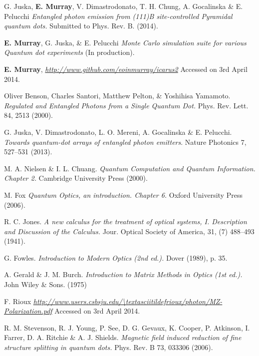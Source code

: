 \documentclass[12pt, twoside]{article}
\numberwithin{equation}{section}
\begin{document}
\begin{thebibliography}{99}

  G. Juska, \textbf{E. Murray}, V. Dimastrodonato, T. H. Chung, A. Gocalinska \& E. Pelucchi
  \emph{Entangled photon emission from (111)B site-controlled Pyramidal quantum dots.}
  Submitted to Phys. Rev. B.
  (2014).

  \textbf{E. Murray}, G. Juska, \& E. Pelucchi
  \emph{Monte Carlo simulation suite for various Quantum dot experiments}
  (In production).

  \textbf{E. Murray},
  \emph{ \url{http://www.github.com/eoinmurray/icarus2} }
  Accessed on 3rd April 2014.

  Oliver Benson, Charles Santori, Matthew Pelton, \& Yoshihisa Yamamoto.
  \emph{Regulated and Entangled Photons from a Single Quantum Dot.}
  Phys. Rev. Lett.
  84,
  2513 (2000).

  G. Juska, V. Dimastrodonato, L. O. Mereni, A. Gocalinska \& E. Pelucchi.
  \emph{Towards quantum-dot arrays of entangled photon emitters}.
  Nature Photonics 
  7, 
  527–531 (2013).

   M. A. Nielsen \& I. L. Chuang.
   \emph{Quantum Computation and Quantum Information. Chapter 2.}
   Cambridge University Press (2000). 

    M. Fox
   \emph{Quantum Optics, an introduction. Chapter 6.}
   Oxford University Press (2006). 

  R. C. Jones.
  \emph{A new calculus for the treatment of optical systems, I. Description and Discussion of the Calculus.}
  Jour. Optical Society of America,
  31, 
  (7) 488–493 (1941).

  G. Fowles.
  \emph{Introduction to Modern Optics (2nd ed.).}
  Dover (1989),
  p. 35.

  A. Gerald \& J. M. Burch.
  \emph{Introduction to Matrix Methods in Optics (1st ed.).} 
  John Wiley \& Sons.
  (1975)

  F. Rioux
  \emph{ \url{http://www.users.csbsju.edu/\textasciitildefrioux/photon/MZ-Polarization.pdf} }
  Accessed on 3rd April 2014.

  R. M. Stevenson, R. J. Young, P. See, D. G. Gevaux, K. Cooper, P. Atkinson, I. Farrer, D. A. Ritchie \& A. J. Shields. 
  \emph{Magnetic field induced reduction of fine structure splitting in quantum dots.}
  Phys. Rev. B 
  73, 
  033306 (2006).


\end{thebibliography}
\end{document}
